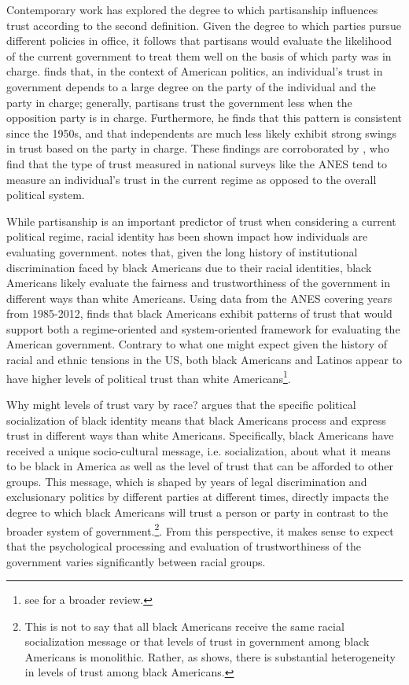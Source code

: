 \documentclass[12t, letterpaper]{article}
\begin{document}
Contemporary work has explored the degree to which partisanship influences trust according to the second definition. Given the degree to which parties pursue different policies in office, it follows that partisans would evaluate the likelihood of the current government to treat them well on the basis of which party was in charge.  \citet{keele2005} finds that, in the context of American politics, an individual's trust in government depends to a large degree on the party of the individual and the party in charge; generally, partisans trust the government less when the opposition party is in charge. Furthermore, he finds that this pattern is consistent since the 1950s, and that independents are much less likely exhibit strong swings in trust based on the party in charge. These findings are corroborated by \citet{cook2005}, who find that the type of trust measured in national surveys like the ANES tend to measure an individual's trust in the current regime as opposed to the overall political system. 

While partisanship is an important predictor of trust when considering a current political regime, racial identity has been shown impact how individuals are evaluating government. \citet{wilkes2015} notes that, given the long history of institutional discrimination faced by black Americans due to their racial identities, black Americans likely evaluate the fairness and trustworthiness of the government in different ways than white Americans. Using data from the ANES covering years from 1985-2012, \citeauthor{wilkes2015} finds that black Americans exhibit patterns of trust that would support both a regime-oriented and system-oriented framework for evaluating the American government. Contrary to what one might expect given the history of racial and ethnic tensions in the US, both black Americans and Latinos appear to have higher levels of political trust than white Americans\footnote{see \citet{wilkes2018} for a broader review.}.

Why might levels of trust vary by race? \citet{nunnally2012} argues that the specific political socialization of black identity means that black Americans process and express trust in different ways than white Americans. Specifically, black Americans have received a unique socio-cultural message, i.e. socialization, about what it means to be black in America as well as the level of trust that can be afforded to other groups. This message, which is shaped by years of legal discrimination and exclusionary politics by different parties at different times, directly impacts the degree to which black Americans will trust a person or party in contrast to the broader system of government.\footnote{This is not to say that all black Americans receive the same racial socialization message or that levels of trust in government among black Americans is monolithic. Rather, as \citeauthor{nunnally2012} shows, there is substantial heterogeneity in levels of trust among black Americans.}. From this perspective, it makes sense to expect that the psychological processing and evaluation of trustworthiness of the government varies significantly between racial groups.
\end{document}
